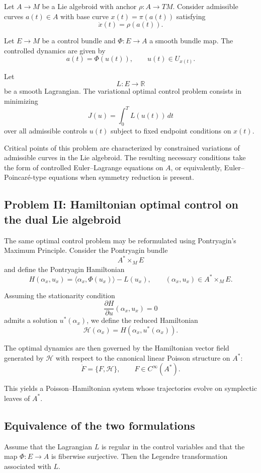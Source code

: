 \documentclass{article}
\begin{document}
Let $A \to M$ be a Lie algebroid with anchor $\rho : A \to TM$.  
Consider admissible curves $a(t) \in A$ with base curve $x(t)=\pi(a(t))$ satisfying
\[
\dot{x}(t) = \rho(a(t)).
\]

Let $E \to M$ be a control bundle and $\Phi : E \to A$ a smooth bundle map.  
The controlled dynamics are given by
\[
a(t) = \Phi(u(t)), \qquad u(t) \in U_{x(t)}.
\]

Let
\[
L : E \to \mathbb{R}
\]
be a smooth Lagrangian.  
The variational optimal control problem consists in minimizing
\[
J(u) = \int_0^T L(u(t))\,dt
\]
over all admissible controls $u(t)$ subject to fixed endpoint conditions on $x(t)$.

Critical points of this problem are characterized by constrained variations of admissible curves in the Lie algebroid.  
The resulting necessary conditions take the form of controlled Euler--Lagrange equations on $A$, or equivalently, Euler--Poincaré-type equations when symmetry reduction is present.

\subsection{Problem II: Hamiltonian optimal control on the dual Lie algebroid}

The same optimal control problem may be reformulated using Pontryagin's Maximum Principle.  
Consider the Pontryagin bundle
\[
A^* \times_M E
\]
and define the Pontryagin Hamiltonian
\[
H(\alpha_x,u_x) = \langle \alpha_x, \Phi(u_x) \rangle - L(u_x),
\qquad (\alpha_x,u_x) \in A^* \times_M E.
\]

Assuming the stationarity condition
\[
\frac{\partial H}{\partial u}(\alpha_x,u_x) = 0
\]
admits a solution $u^*(\alpha_x)$, we define the reduced Hamiltonian
\[
\mathcal{H}(\alpha_x) = H(\alpha_x,u^*(\alpha_x)).
\]

The optimal dynamics are then governed by the Hamiltonian vector field generated by $\mathcal{H}$ with respect to the canonical linear Poisson structure on $A^*$:
\[
\dot{F} = \{F,\mathcal{H}\}, \qquad F \in C^\infty(A^*).
\]

This yields a Poisson--Hamiltonian system whose trajectories evolve on symplectic leaves of $A^*$.

\subsection{Equivalence of the two formulations}

Assume that the Lagrangian $L$ is regular in the control variables and that the map $\Phi : E \to A$ is fiberwise surjective.  
Then the Legendre transformation associated with $L.$
\end{document}
